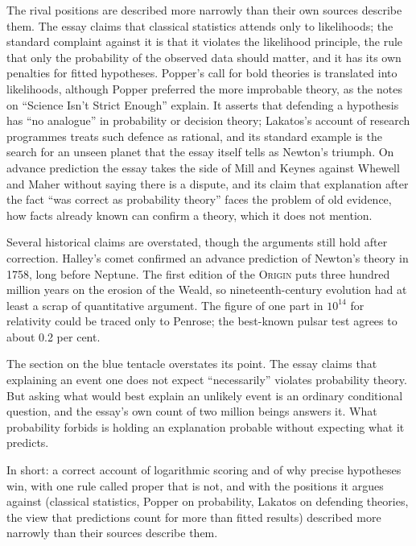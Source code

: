 \begin{afterword}
The rival positions are described more narrowly than their own sources describe them. The essay claims that classical statistics attends only to likelihoods; the standard complaint against it is that it violates the likelihood principle, the rule that only the probability of the observed data should matter, and it has its own penalties for fitted hypotheses. Popper's call for bold theories is translated into likelihoods, although Popper preferred the more improbable theory, as the notes on ``Science Isn't Strict Enough'' explain. It asserts that defending a hypothesis has ``no analogue'' in probability or decision theory; Lakatos's account of research programmes treats such defence as rational, and its standard example is the search for an unseen planet that the essay itself tells as Newton's triumph. On advance prediction the essay takes the side of Mill and Keynes against Whewell and Maher without saying there is a dispute, and its claim that explanation after the fact ``was correct as probability theory'' faces the problem of old evidence, how facts already known can confirm a theory, which it does not mention.

Several historical claims are overstated, though the arguments still hold after correction. Halley's comet confirmed an advance prediction of Newton's theory in 1758, long before Neptune. The first edition of the \textsc{Origin} puts three hundred million years on the erosion of the Weald, so nineteenth-century evolution had at least a scrap of quantitative argument. The figure of one part in $10^{14}$ for relativity could be traced only to Penrose; the best-known pulsar test agrees to about 0.2 per cent.

The section on the blue tentacle overstates its point. The essay claims that explaining an event one does not expect ``necessarily'' violates probability theory. But asking what would best explain an unlikely event is an ordinary conditional question, and the essay's own count of two million beings answers it. What probability forbids is holding an explanation probable without expecting what it predicts.

In short: a correct account of logarithmic scoring and of why precise hypotheses win, with one rule called proper that is not, and with the positions it argues against (classical statistics, Popper on probability, Lakatos on defending theories, the view that predictions count for more than fitted results) described more narrowly than their sources describe them.
\end{afterword}
